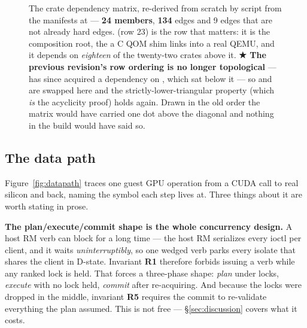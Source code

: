 \documentclass[10.5pt]{article}
\begin{document}
\begin{landscape}\begin{figure}[p]
\centering
{}
\caption{The crate dependency matrix, re-derived from scratch by script from the manifests at
 — \textbf{24 members}, \textbf{134} \code{[dependencies]} edges and 9
 edges that are not already hard edges.  (row 23)
is the row that matters: it is the composition root, the  a C QOM shim links into
a real QEMU, and it depends on \emph{eighteen} of the twenty-two crates above it. \textbf{★ The
previous revision's row ordering is no longer topological} —  has since acquired a
dependency on , which sat below it — so  and  are swapped
here and the strictly-lower-triangular property (which \emph{is} the acyclicity proof) holds
again. Drawn in the old order the matrix would have carried one dot above the diagonal and
nothing in the build would have said so.}
\label{fig:deps}
\end{figure}\end{landscape}

\subsection{The data path}

Figure~\ref{fig:datapath} traces one guest GPU operation from a CUDA call to real silicon and
back, naming the symbol each step lives at. Three things about it are worth stating in prose.

\textbf{The plan/execute/commit shape is the whole concurrency design.} A host RM verb can block
for a long time — the host RM serializes every ioctl per client, and it waits
\emph{uninterruptibly}, so one wedged verb parks every isolate that shares the client in
D-state. Invariant \textbf{R1} therefore forbids issuing a verb while any ranked lock is held.
That forces a three-phase shape: \emph{plan} under locks, \emph{execute} with no lock held,
\emph{commit} after re-acquiring. And because the locks were dropped in the middle, invariant
\textbf{R5} requires the commit to re-validate everything the plan assumed. This is not free —
\S\ref{sec:discussion} covers what it costs.
\end{document}
